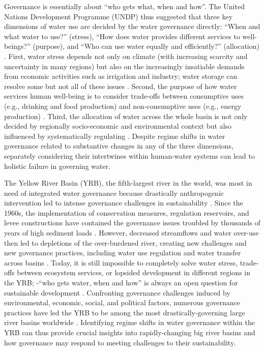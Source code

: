 Governance is essentially about ``who gets what, when and how''\cite{lasswell2018}. The United Nations Development Programme (UNDP) thus suggested that three key dimensions of water use are decided by the water governance directly: ``When and what water to use?'' (stress), ``How does water provides different services to well-beings?'' (purpose), and ``Who can use water equally and efficiently?'' (allocation)
\cite{undpwatergovernancefacility2016}.
First, water stress depends not only on climate (with increasing scarcity and uncertainty in many regions) but also on the increasingly insatiable demands from economic activities such as irrigation and industry; water storage can resolve some but not all of these issues
\cite{qin2019,wada2014,huang2021}.
Second, the purpose of how water services human well-being is to consider trade-offs between consumptive uses (e.g., drinking and food production) and non-consumptive uses (e.g., energy production)
\cite{liu2017,florke2018,jaeger2019}.
Third, the allocation of water across the whole basin is not only decided by regionally socio-economic and environmental context but also influenced by systematically regulating
\cite{schmandt2021,speed2013}.
Despite regime shifts in water governance related to substantive changes in any of the three dimensions, separately considering their intertwines within human-water systems can lead to holistic failure in governing water.

The Yellow River Basin (YRB), the fifth-largest river in the world, was most in need of integrated water governance because drastically anthropogenic intervention led to intense governance challenges in sustainability
\cite{mostern2021}.
Since the 1960s, the implementation of conservation measures, regulation reservoirs, and levee constructions have contained the governance issues troubled by thousands of years of high sediment loads
\cite{wang2016e,song2020a}.
However, decreased streamflows and water over-use then led to depletions of the over-burdened river, creating new challenges and new governance practices, including water use regulation and water transfer across basins
\cite{wang2019c}.
Today, it is still impossible to completely solve water stress, trade-offs between ecosystem services, or lopsided development in different regions in the YRB; -``who gets water, when and how'' is always an open question for sustainable development
\cite{wohlfart2016a}.
Confronting governance challenges induced by environmental, economic, social, and political factors, numerous governance practices have led the YRB to be among the most drastically-governing large river basins worldwide \cite{nickum2021}.
Identifying regime shifts in water governance within the YRB can thus provide crucial insights into rapidly-changing big river basins and how governance may respond to meeting challenges to their sustainability.

